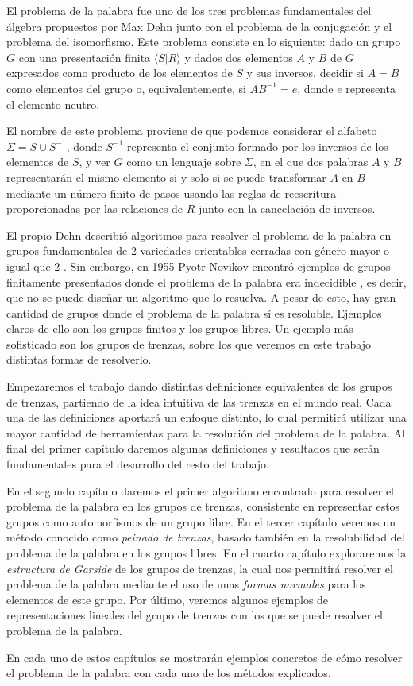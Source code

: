 \documentclass[TFG.tex]{subfiles}
\begin{document}

El problema de la palabra fue uno de los tres problemas fundamentales del álgebra propuestos por Max Dehn \cite{Dehn11} junto con el problema de la conjugación y el problema del isomorfismo. Este problema consiste en lo siguiente: dado un grupo $G$ con una presentación finita $\langle S| R\rangle$ y dados dos elementos $A$ y $B$ de $G$ expresados como producto de los elementos de $S$ y sus inversos, decidir si $A=B$ como elementos del grupo o, equivalentemente, si $AB^{-1}=e$, donde $e$ representa el elemento neutro.

El nombre de este problema proviene de que podemos considerar el alfabeto $\Sigma=S\cup S^{-1}$, donde $S^{-1}$ representa el conjunto formado por los inversos de los elementos de $S$, y ver $G$ como un lenguaje sobre $\Sigma$, en el que dos palabras $A$ y $B$ representarán el mismo elemento si y solo si se puede transformar $A$ en $B$ mediante un número finito de pasos usando las reglas de reescritura proporcionadas por las relaciones de $R$ junto con la cancelación de inversos.  

El propio Dehn describió algoritmos para resolver el problema de la palabra en grupos fundamentales de 2-variedades orientables cerradas con género mayor o igual que 2 \cite{Dehn12}. Sin embargo, en 1955 Pyotr Novikov encontró ejemplos de grupos finitamente presentados donde el problema de la palabra era indecidible \cite{Novikov}, es decir, que no se puede diseñar un algoritmo que lo resuelva. A pesar de esto, hay gran cantidad de grupos donde el problema de la palabra sí es resoluble. Ejemplos claros de ello son los grupos finitos y los grupos libres. Un ejemplo más sofisticado son los grupos de trenzas, sobre los que veremos en este trabajo distintas formas de resolverlo.

Empezaremos el trabajo dando distintas definiciones equivalentes de los grupos de trenzas, partiendo de la idea intuitiva de las trenzas en el mundo real. Cada una de las definiciones aportará un enfoque distinto, lo cual permitirá utilizar una mayor cantidad de herramientas para la resolución del problema de la palabra. Al final del primer capítulo daremos algunas definiciones y resultados que serán fundamentales para el desarrollo del resto del trabajo. 

En el segundo capítulo daremos el primer algoritmo encontrado para resolver el problema de la palabra en los grupos de trenzas, consistente en representar estos grupos como automorfismos de un grupo libre. En el tercer capítulo veremos un método conocido como \emph{peinado de trenzas}, basado también en la resolubilidad del problema de la palabra en los grupos libres. En el cuarto capítulo exploraremos la \emph{estructura de Garside} de los grupos de trenzas, la cual nos permitirá resolver el problema de la palabra mediante el uso de unas \emph{formas normales} para los elementos de este grupo. Por último, veremos algunos ejemplos de representaciones lineales del grupo de trenzas con los que se puede resolver el problema de la palabra. 

En cada uno de estos capítulos se mostrarán ejemplos concretos de cómo resolver el problema de la palabra con cada uno de los métodos explicados. 
\end{document}

